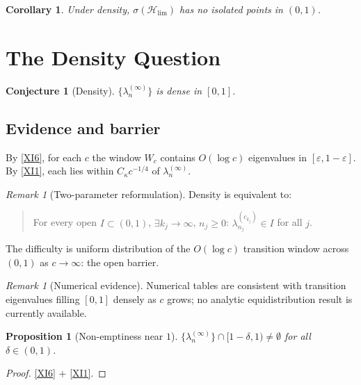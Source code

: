 \documentclass[12pt,a4paper]{amsart}
\newtheorem{proposition}[theorem]{Proposition}
\newtheorem{corollary}[theorem]{Corollary}
\newtheorem{conjecture}[theorem]{Conjecture}
\theoremstyle{definition}
\theoremstyle{remark}
\newtheorem{remark}[theorem]{Remark}
\newcommand{\Hlim}{\mathcal{H}_{\lim}}
\begin{document}
\begin{corollary}
Under density, $\sigma(\Hlim)$ has no
isolated points in $(0,1)$.
\end{corollary}

\section{The Density Question}
\label{sec:density-question}

\begin{conjecture}[Density]
\label{conj:density}
$\{\lambda_n^{(\infty)}\}$ is dense in $[0,1]$.
\end{conjecture}

\subsection{Evidence and barrier}

By \eqref{XI6}, for each $c$ the window
$W_c$ contains $O(\log c)$ eigenvalues in
$[\varepsilon,1-\varepsilon]$.
By \eqref{XI1}, each lies within
$C_\kappa c^{-1/4}$ of $\lambda_n^{(\infty)}$.

\begin{remark}[Two-parameter reformulation]
\label{rem:density-gap}
Density is equivalent to:
\begin{quote}
  For every open $I\subset(0,1)$,
  $\exists k_j\to\infty$, $n_j\ge 0$:
  $\lambda_{n_j}^{(c_{k_j})}\in I$ for all $j$.
\end{quote}
The difficulty is uniform distribution of
the $O(\log c)$ transition window across
$(0,1)$ as $c\to\infty$: the open barrier.
\end{remark}

\begin{remark}[Numerical evidence]
\label{rem:density-numerical}
Numerical tables \cite{Slepian1961,Osipov2013}
are consistent with transition eigenvalues
filling $[0,1]$ densely as $c$ grows;
no analytic equidistribution
result is currently available.
\end{remark}

\begin{proposition}[Non-emptiness near $1$]
$\{\lambda_n^{(\infty)}\}\cap[1{-}\delta,1)
\ne\emptyset$ for all $\delta\in(0,1)$.
\end{proposition}
\begin{proof}\eqref{XI6} + \eqref{XI1}.\end{proof}
\end{document}
